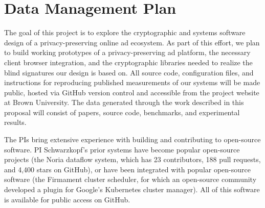 \section*{Data Management Plan}

%
%
%
%
%

%
The goal of this project is to explore the cryptographic and systems software
design of a privacy-preserving online ad ecosystem.
%
As part of this effort, we plan to build working prototypes of a
privacy-preserving ad platform, the necessary client browser integration, and
the cryptographic libraries needed to realize the blind signatures our design
is based on.
%
All source code, configuration files, and instructions for reproducing published
measurements of our systems will be made public, hosted via GitHub version
control and accessible from the project website at Brown University.
%
The data generated through the work described in this proposal will consist of
papers, source code,  benchmarks, and experimental results.
%

%
The PIs bring extensive experience with building and contributing to open-source
software.
%
PI Schwarzkopf's prior systems have become popular open-source projects (\eg the
Noria dataflow system, which has 23 contributors, 188 pull requests, and 4,400 stars
on GitHub), or have been integrated with popular open-source software (\eg the
Firmament cluster scheduler, for which an open-source community developed a
plugin for Google's Kubernetes cluster manager).
%
All of this software is available for public access on GitHub.
%

